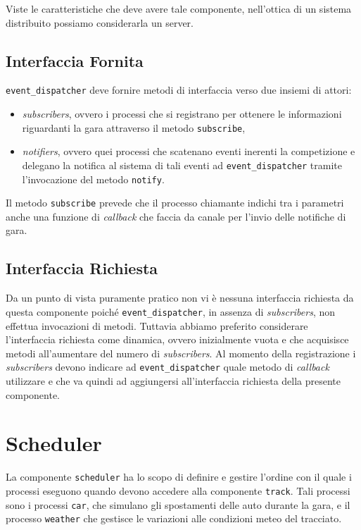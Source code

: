 \documentclass[a4paper]{report}
\newcommand{\fun}[1]{\texttt{#1}}
\begin{document}
Viste le caratteristiche che deve avere tale componente, nell'ottica di un sistema distribuito possiamo considerarla un server.

\subsection*{Interfaccia Fornita}
\texttt{event\_dispatcher} deve fornire metodi di interfaccia verso due insiemi di attori:
\begin{itemize}
\item \textit{subscribers}, ovvero i processi che si registrano per ottenere le informazioni riguardanti la gara attraverso il metodo \fun{subscribe},
\item \textit{notifiers}, ovvero quei processi che scatenano eventi inerenti la competizione e delegano la notifica al sistema di tali eventi ad \texttt{event\_dispatcher} tramite l'invocazione del metodo \fun{notify}.
\end{itemize}
Il metodo \fun{subscribe} prevede che il processo chiamante indichi tra i parametri anche una funzione di \textit{callback} che faccia da canale per l'invio delle notifiche di gara.

\subsection*{Interfaccia Richiesta}
Da un punto di vista puramente pratico non vi è nessuna interfaccia richiesta da questa componente poiché \texttt{event\_dispatcher}, in assenza di \textit{subscribers}, non effettua invocazioni di metodi. Tuttavia abbiamo preferito considerare l'interfaccia richiesta come dinamica, ovvero inizialmente vuota e che acquisisce metodi all'aumentare del numero di \textit{subscribers}. Al momento della registrazione i \textit{subscribers} devono indicare ad \texttt{event\_dispatcher} quale metodo di \textit{callback} utilizzare e che va quindi ad aggiungersi all'interfaccia richiesta della presente componente.


\section{Scheduler}
La componente \texttt{scheduler} ha lo scopo di definire e gestire l'ordine con il quale i processi eseguono quando devono accedere alla componente \texttt{track}.
Tali processi sono i processi \texttt{car}, che simulano gli spostamenti delle auto durante la gara, e il processo \texttt{weather} che gestisce le variazioni alle condizioni meteo del tracciato.
\end{document}

